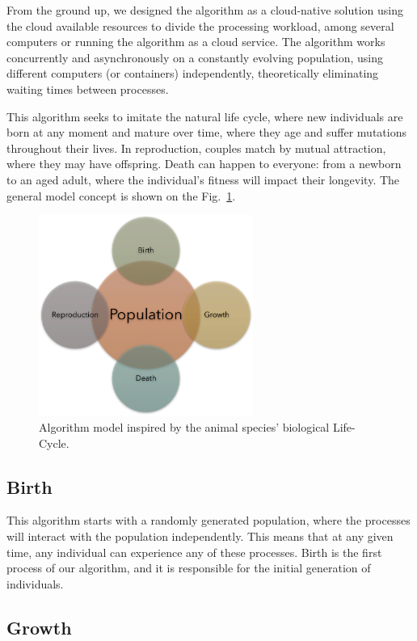 \documentclass[runningheads]{llncs}
\begin{document}
From the ground up, we designed the algorithm as a cloud-native solution using
the cloud available resources to divide the processing workload, among several
computers or running the algorithm as a cloud service. The algorithm works
concurrently and asynchronously on a constantly evolving population, using
different computers (or containers) independently, theoretically eliminating
waiting times between processes.

This algorithm seeks to imitate the natural life cycle, where new individuals
are born at any moment and mature over time, where they age and suffer
mutations throughout their lives. In reproduction, couples match by mutual
attraction, where they may have offspring. Death can happen to everyone: from a
newborn to an aged adult, where the individual's fitness will impact their
longevity. The general model concept is shown on the Fig.~\ref{fig2}.

\begin{figure}
    \centering
    \includegraphics[width=70mm]{img/fig2_proposal.pdf}
    \caption{Algorithm model inspired by the animal species' biological Life-Cycle.} \label{fig2}
    \end{figure}

\subsection{Birth}

This algorithm starts with a randomly generated population, where the processes
will interact with the population independently. This means that at any given
time, any individual can experience any of these processes. Birth is the first
process of our algorithm, and it is responsible for the initial generation of
individuals.

\subsection{Growth}
\end{document}
